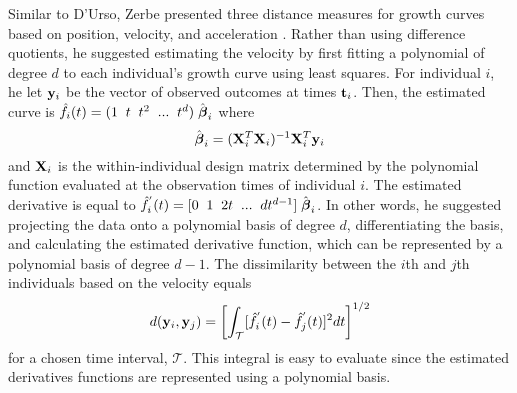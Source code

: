 Similar to D'Urso, Zerbe presented three distance measures for growth curves based on position, velocity, and acceleration \cite{zerbe1979,schneiderman1993}. Rather than using difference quotients, he suggested estimating the velocity by first fitting a polynomial of degree $d$ to each individual's growth curve using least squares. For individual $i$, he let $\mathbf y_{i}$ be the vector of observed outcomes at times $\mathbf t_{i}$. Then, the estimated curve is $\hat{f}_{i}(t) = (1\;\; t\;\;t^{2}\;\;...\;\;t^{d})\;\hat{\boldsymbol\beta}_{i}$ where 
$$\hat{\boldsymbol\beta}_{i} = (\mathbf X^{T}_{i}\mathbf X_{i})^{-1}\mathbf X^{T}_{i}\mathbf y_{i}$$
and $\mathbf X_{i}$ is the within-individual design matrix determined by the polynomial function evaluated at the observation times of individual $i$. The estimated derivative is equal to
$\hat{f}_{i}^{'}(t) = [0\;\; 1\;\;2t\;\;...\;\;dt^{d-1}]\;\hat{\boldsymbol\beta}_{i}$. In other words, he suggested projecting the data onto a polynomial basis of degree $d$, differentiating the basis, and calculating the estimated derivative function, which can be represented by a polynomial basis of degree $d-1$. The dissimilarity between the $i$th and $j$th individuals based on the velocity equals
$$d(\mathbf y_{i},\mathbf y_{j}) =\left[ \int_{\mathcal{T}} [\hat{f}^{'}_{i}(t)-\hat{f}^{'}_{j}(t)]^{2}dt\right]^{1/2}$$
for a chosen time interval, $\mathcal{T}$. This integral is easy to evaluate since the estimated derivatives functions are represented using a polynomial basis.


